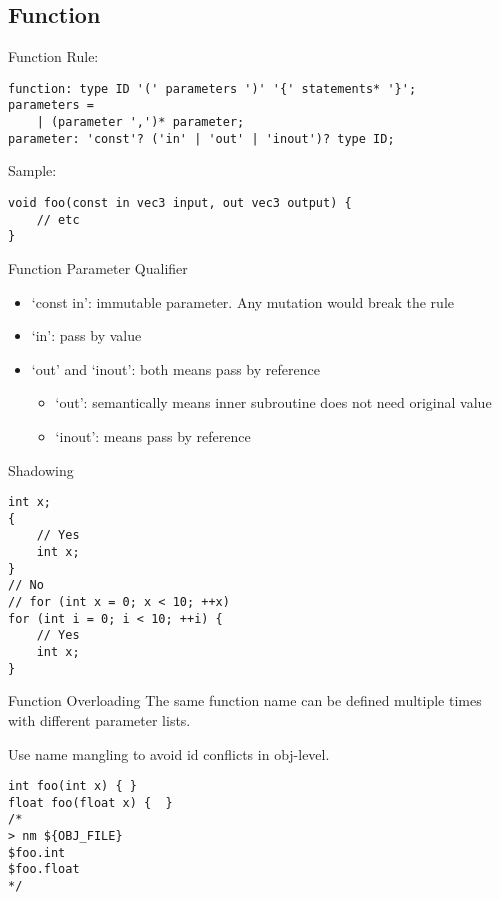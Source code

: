 \subsection{Function}

\begin{frame}[fragile]{Function}
    Rule:
    \begin{lstlisting}
function: type ID '(' parameters ')' '{' statements* '}';
parameters =
    | (parameter ',')* parameter;
parameter: 'const'? ('in' | 'out' | 'inout')? type ID;
    \end{lstlisting}
    Sample:
    \begin{lstlisting}
void foo(const in vec3 input, out vec3 output) {
    // etc
}
    \end{lstlisting}
\end{frame}

\begin{frame}[fragile]{Function Parameter Qualifier}
    \begin{itemize}
        \item `const in': immutable parameter. Any mutation would break the rule
        \item `in': pass by value
        \item `out' and `inout': both means pass by reference
        \begin{itemize}
            \item `out': semantically means inner subroutine does not need original value
            \item `inout': means pass by reference
        \end{itemize}
    \end{itemize}
\end{frame}

\begin{frame}[fragile]{Shadowing}
    \begin{lstlisting}
int x;
{
    // Yes
    int x;
}
// No
// for (int x = 0; x < 10; ++x)
for (int i = 0; i < 10; ++i) {
    // Yes
    int x;
}
    \end{lstlisting}
\end{frame}

\begin{frame}[fragile]{Function Overloading}
    The same function name can be defined multiple times 
    with different parameter lists.

    Use name mangling to avoid id conflicts in obj-level.
    \begin{lstlisting}
int foo(int x) { }
float foo(float x) {  }
/*
> nm ${OBJ_FILE}
$foo.int
$foo.float
*/
    \end{lstlisting}
\end{frame}
